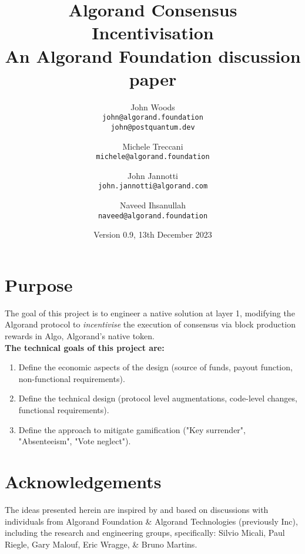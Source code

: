 \documentclass[11pt,a4paper]{article}
\begin{document}
\title {Algorand Consensus Incentivisation \\
       {\large \sc An Algorand Foundation discussion paper}}
\date  {Version 0.9, 13th December 2023}
\author{
    John Woods \\ 
    {\small \texttt{john@algorand.foundation}} \\
    {\small \texttt{john@postquantum.dev}} \\
\and 
    Michele Treccani \\
    {\small \texttt{michele@algorand.foundation}}
\and 
    John Jannotti \\
    {\small \texttt{john.jannotti@algorand.com}}
\and 
    Naveed Ihsanullah \\
    {\small \texttt{naveed@algorand.foundation}}
}

\maketitle

\section{Purpose}
The goal of this project is to engineer a native solution at layer 1, modifying the Algorand protocol to 
\emph{incentivise} the execution of consensus via block production rewards in Algo, Algorand's native token. \\

\textbf{The technical goals of this project are:}

\begin{enumerate}
    \item Define the economic aspects of the design (source of funds, payout function, non-functional requirements). 
        
    \item Define the technical design (protocol level augmentations, code-level changes, functional requirements). 
        
    \item Define the approach to mitigate gamification ("Key surrender", "Absenteeism", "Vote neglect").
\end{enumerate}

\pagebreak

\tableofcontents

\pagebreak

\section{Acknowledgements}
The ideas presented herein are inspired by and based on discussions with individuals from Algorand Foundation \& 
Algorand Technologies (previously Inc), including the research and engineering groups, specifically: Silvio Micali, 
Paul Riegle, Gary Malouf, Eric Wragge, \& Bruno Martins.
\end{document}
